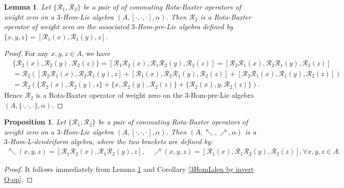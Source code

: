 \documentclass[a4paper,11pt]{article}
\def\a{\alpha}
\def\c{\cdot}
\def\nw{\nwarrow}
\def\ne{\nearrow}
\newtheorem{lem}[thm]{Lemma}
\newtheorem{pro}[thm]{Proposition}
\theoremstyle{definition}
\begin{document}
\begin{lem}\label{commuting rota-baxter op}
Let $\{\mathcal R_1,\mathcal R_2\}$ be a pair of of commuting Rota-Baxter operators of weight zero on a $3$-Hom-Lie algebra $(A, [\c,\c,\c],\a)$. Then $\mathcal R_2$ is a Rota-Baxter operator of weight zero on the associated $3$-Hom-pre-Lie algebra
defined by  $\{x,y,z\}=[\mathcal R_1(x),\mathcal R_1(y),z]$.
\end{lem}

\begin{proof}
For any $x,y,z \in A$, we have
\begin{align*}
&\{\mathcal R_2(x),\mathcal R_2(y),\mathcal R_2(z)\}=[\mathcal R_1\mathcal R_2(x),\mathcal R_1\mathcal R_2(y),\mathcal R_2(z)] =[\mathcal R_2\mathcal R_1(x),\mathcal R_2\mathcal R_1(y),\mathcal R_2(z)] \\
&=\mathcal R_2([\mathcal R_2\mathcal R_1(x),\mathcal R_2\mathcal R_1(y),z]+[\mathcal R_1(x),\mathcal R_2\mathcal R_1(y),\mathcal R_2(z)]  +
[\mathcal R_2\mathcal R_1(x),\mathcal R_1(y),\mathcal R_2(z)] ) \\
&=\mathcal R_2(\{\mathcal R_2(x),\mathcal R_2(y),z\}+\{x,\mathcal R_2(y),\mathcal R_2(z)\}+\{\mathcal R_2(x),y,\mathcal R_2(z)\}).
\end{align*}
Hence $\mathcal R_2$ is a Rota-Baxter operator of weight zero on the $3$-Hom-pre-Lie algebra
$(A,\{\c,\c,\c\},\a)$.
\end{proof}

\begin{pro}
Let $\{\mathcal R_1,\mathcal R_2\}$ be a pair of commuting Rota-Baxter operators of weight zero on a $3$-Hom-Lie algebra $(A, [\c,\c,\c],\a)$. Then $(A,\nw,\ne,\a)$  is a $3$-Hom-L-dendriform algebra, where the two brackets are  defined by:
\begin{align*}
\nw(x,y,z)=[\mathcal R_1\mathcal R_2(x),\mathcal R_1\mathcal R_2(y),z],\quad \ne(x,y,z)=[\mathcal R_1(x),\mathcal R_1\mathcal R_2(y),\mathcal R_2(z)], \forall x,y,z \in A.
\end{align*}
\end{pro}

\begin{proof}
It follows immediately from Lemma \ref{commuting rota-baxter op} and Corollary \ref{3HomLden by invert O-op}.
\end{proof}
\end{document}
